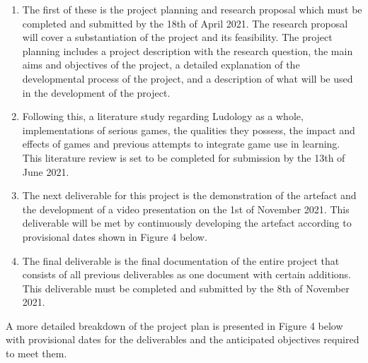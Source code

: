 \begin{enumerate}
\item The first of these is the project planning and research proposal which must be completed and submitted by the 18th of April 2021. The research proposal will cover a substantiation of the project and its feasibility. The project planning includes a project description with the research question, the main aims and objectives of the project, a detailed explanation of the developmental process of the project, and a description of what will be used in the development of the project.

\item Following this, a literature study regarding Ludology as a whole, implementations of serious games, the qualities they possess, the impact and effects of games and previous attempts to integrate game use in learning. This literature review is set to be completed for submission by the 13th of June 2021. 

\item The next deliverable for this project is the demonstration of the artefact and the development of a video presentation on the 1st of November 2021. This deliverable will be met by continuously developing the artefact according to provisional dates shown in Figure 4 below. 

\item The final deliverable is the final documentation of the entire project that consists of all previous deliverables as one document with certain additions. This deliverable must be completed and submitted by the 8th of November 2021.
\end{enumerate}

A more detailed breakdown of the project plan is presented in Figure 4 below with provisional dates for the deliverables and the anticipated objectives required to meet them.



